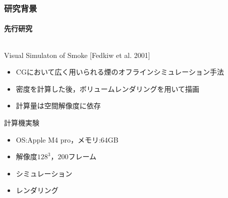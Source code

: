 \documentclass[aspectratio=169,dvipdfmx,hyperref={bookmarks=true}]{beamer}
\begin{document}
\begin{frame}
 \frametitle{研究背景}
   \framesubtitle{先行研究}
\begin{columns}[T]
	\begin{column}{0.6\linewidth}
	\begin{block}{Visual Simulaton of Smoke \cite{fedkiw} [Fedkiw et al. 2001]}
		\begin{itemize}
		\item CGにおいて広く用いられる煙のオフラインシミュレーション手法
		\item 密度を計算した後，ボリュームレンダリングを用いて描画
		\item 計算量は空間解像度に依存
	\end{itemize}
	\end{block}
	
	\begin{block}{計算機実験}
	\begin{itemize}
	\item OS:Apple M4 pro，メモリ:64GB
	\item 解像度$128^3$，$200$フレーム
	\item シミュレーション
	\item レンダリング
	\end{itemize}
	\end{block}
    	\end{column}
	\begin{column}{0.4\linewidth}
    	\end{column}
    \end{columns}
 \end{frame}
\end{document}
